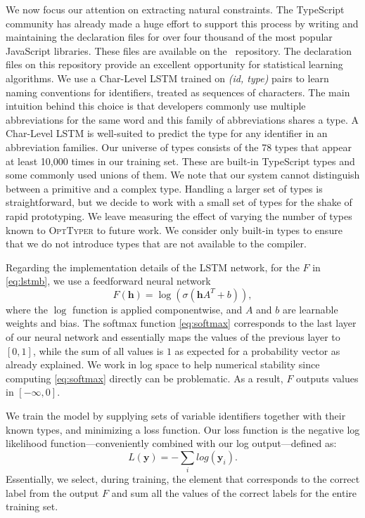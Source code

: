 \documentclass[sigplan,10pt,review,anonymous]{acmart} %
\newcommand{\projectname}{\textsc{OptTyper}\xspace}
\theoremstyle{plain}
\theoremstyle{remark}
\theoremstyle{definition}
\begin{document}
We now focus our attention on extracting natural constraints.
The TypeScript community has already
made a huge effort to support this process by writing and maintaining the
declaration files for over four thousand of the most popular JavaScript
libraries. These files are available on the~\citet{definitelytyped}
repository. The declaration files on this repository provide an excellent
opportunity for statistical learning algorithms.
We use a Char-Level LSTM trained on
\textit{(id, type)} pairs to learn naming conventions
for identifiers, treated as sequences of characters.
The main intuition behind this choice is that
developers commonly use multiple abbreviations for the same word and
this family of abbreviations shares a type.
A Char-Level LSTM is well-suited to predict the type for any identifier in
an abbreviation families.
%
Our universe of types consists of the 78 types that appear at least 10,000 times in our training set. These are built-in TypeScript types and some commonly used unions of them. We note that our system cannot distinguish between a primitive and a complex type. 
%
Handling a larger set of types
is straightforward, but we decide to work with a small set of types for the
shake of rapid prototyping.
%
We leave measuring the effect
of varying the number of types known to \projectname to future work.
%
We consider only built-in types
to ensure that we do not introduce types that are not available to the compiler. 

Regarding the implementation details of the LSTM network, for the $F$ in \eqref{eq:lstmb},
we use a feedforward neural network
\begin{equation}
	F(\bm{h}) = \log\left( \sigma\left(\bm{h}A^T + b \right) \right),\label{eq:feedforward}
\end{equation}
where the $\log$ function is applied componentwise,
and $A$ and $b$ are learnable weights and bias.
The softmax function \eqref{eq:softmax} corresponds to the last layer of our neural network
and essentially maps the values of the previous layer to $[0, 1]$,
while the sum of all values is $1$ as expected for a probability vector as already explained.
We work in log space to help numerical stability since computing \eqref{eq:softmax} directly can be problematic.
As a result, $F$ outputs values in $[-\infty, 0]$.

We train the model by supplying sets of variable identifiers together with their known types,
and minimizing a loss function.
Our loss function is the negative log likelihood function---conveniently combined with our log output---defined as:
\begin{equation}
	L(\bm{y}) = -\sum_i log(\bm{y}_i).
\end{equation}
Essentially, we select, during training, the element that corresponds
to the correct label from the output $F$
and sum all the values of the correct labels for the entire training set.
\end{document}
